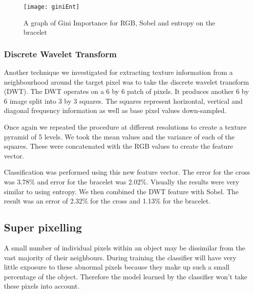 \documentclass[12pt]{IIBproject}
\begin{document}
\begin{figure}[H]
  \caption{A graph of Gini Importance for RGB, Sobel and entropy on the bracelet}
  \centering
    \texttt{[image: giniEnt]}

\end{figure}

\subsubsection{Discrete Wavelet Transform}

Another technique we investigated for extracting texture information from a neighbourhood around the target pixel was to take the discrete wavelet transform (DWT)\cite{shensa1992discrete}.  The DWT operates on a 6 by 6 patch of pixels. It produces another 6 by 6 image split into 3 by 3 squares. The squares represent horizontal, vertical and diagonal frequency information as well as base pixel values down-sampled. 

Once again we repeated the procedure at different resolutions to create a texture pyramid of 5 levels. We took the mean values and the variance of each of the squares. These were concatenated with the RGB values to create the feature vector. 

Classification was performed using this new feature vector. The error for the cross was 3.78\% and error for the bracelet was 2.02\%. Visually the results were very similar to using entropy. We then combined the DWT feature with Sobel. The result was an error of 2.32\% for the cross and 1.13\% for the bracelet. 

\subsection{Super pixelling}
A small number of individual pixels within an object may be dissimilar from the vast majority of their neighbours. During training the classifier will have very little exposure to these abnormal pixels because they make up such a small percentage of the object. Therefore the model learned by the classifier won't take these pixels into account. 
\end{document}
